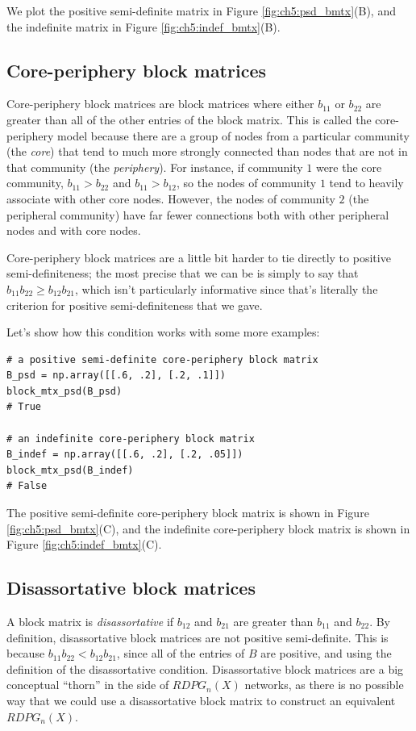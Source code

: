 We plot the positive semi-definite matrix in Figure \ref{fig:ch5:psd_bmtx}(B), and the indefinite matrix in Figure \ref{fig:ch5:indef_bmtx}(B).

\subsection{Core-periphery block matrices}

Core-periphery block matrices are block matrices where either $b_{11}$ or $b_{22}$ are greater than all of the other entries of the block matrix. This is called the core-periphery model because there are a group of nodes from a particular community (the \textit{core}) that tend to much more strongly connected than nodes that are not in that community (the \textit{periphery}). For instance, if community $1$ were the core community, $b_{11} > b_{22}$ and $b_{11} > b_{12}$, so the nodes of community $1$ tend to heavily associate with other core nodes. However, the nodes of community $2$ (the peripheral community) have far fewer connections both with other peripheral nodes and with core nodes. 

Core-periphery block matrices are a little bit harder to tie directly to positive semi-definiteness; the most precise that we can be is simply to say that $b_{11}b_{22} \geq b_{12}b_{21}$, which isn't particularly informative since that's literally the criterion for positive semi-definiteness that we gave.

Let's show how this condition works with some more examples:


\begin{lstlisting}[style=python]
# a positive semi-definite core-periphery block matrix
B_psd = np.array([[.6, .2], [.2, .1]])
block_mtx_psd(B_psd)
# True

# an indefinite core-periphery block matrix
B_indef = np.array([[.6, .2], [.2, .05]])
block_mtx_psd(B_indef)
# False
\end{lstlisting}

The positive semi-definite core-periphery block matrix is shown in Figure \ref{fig:ch5:psd_bmtx}(C), and the indefinite core-periphery block matrix is shown in Figure \ref{fig:ch5:indef_bmtx}(C).

\subsection{Disassortative block matrices}

A block matrix is \textit{disassortative} if $b_{12}$ and $b_{21}$ are greater than $b_{11}$ and $b_{22}$. By definition, disassortative block matrices are not positive semi-definite. This is because $b_{11}b_{22} < b_{12}b_{21}$, since all of the entries of $B$ are positive, and using the definition of the disassortative condition. Disassortative block matrices are a big conceptual ``thorn'' in the side of $RDPG_n(X)$ networks, as there is no possible way that we could use a disassortative block matrix to construct an equivalent $RDPG_n(X)$. 


